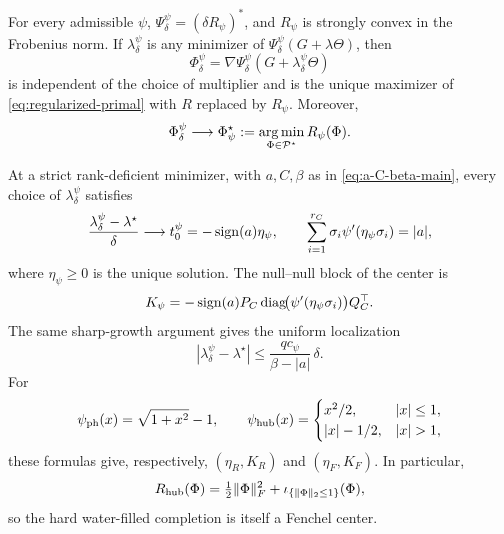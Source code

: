 \begin{proposition}
\label{prop:smoothing-family-main}
For every admissible \(\psi\),
\(\Psi_\delta^\psi=(\delta R_\psi)^*\), and \(R_\psi\) is strongly convex
in the Frobenius norm.  If \(\lambda_\delta^\psi\) is any minimizer of
\(\Psi_\delta^\psi(G+\lambda\Theta)\), then
\[
 \Phi_\delta^\psi=\nabla\Psi_\delta^\psi
   (G+\lambda_\delta^\psi\Theta)
\]
is independent of the choice of multiplier and is the unique maximizer of
\eqref{eq:regularized-primal} with \(R\) replaced by \(R_\psi\).  Moreover,
\begin{equation}
 \Phi_\delta^\psi\longrightarrow
 \Phi_\psi^\star:=\operatorname*{arg\,min}_{\Phi\in\mathcal P^\star}R_\psi(\Phi).
 \label{eq:profile-center-limit-main}
\end{equation}

At a strict rank-deficient minimizer, with \(a,C,\beta\) as in
\eqref{eq:a-C-beta-main}, every choice of \(\lambda_\delta^\psi\) satisfies
\begin{equation}
 \frac{\lambda_\delta^\psi-\lambda^\star}{\delta}
 \longrightarrow t_0^\psi=-\operatorname{sign}(a)\eta_\psi,
 \qquad
 \sum_{i=1}^{r_C}\sigma_i\psi'(\eta_\psi\sigma_i)=|a|,
 \label{eq:profile-strict-rate-main}
\end{equation}
where \(\eta_\psi\ge0\) is the unique solution.  The null--null block of
the center is
\begin{equation}
 K_\psi=-\operatorname{sign}(a)P_C\operatorname{diag}\!\bigl(
 \psi'(\eta_\psi\sigma_i)\bigr)Q_C^\top.
 \label{eq:profile-center-block-main}
\end{equation}
The same sharp-growth argument gives the uniform localization
\begin{equation}
 |\lambda_\delta^\psi-\lambda^\star|
 \le \frac{q c_\psi}{\beta-|a|}\,\delta.
 \label{eq:profile-strict-bound-main}
\end{equation}
For
\begin{equation}
 \psi_{\rm ph}(x)=\sqrt{1+x^2}-1,
 \qquad
 \psi_{\rm hub}(x)=
 \begin{cases}x^2/2,&|x|\le1,\\ |x|-1/2,&|x|>1,
 \end{cases}
 \label{eq:two-profile-members-main}
\end{equation}
these formulas give, respectively, \((\eta_R,K_R)\) and
\((\eta_F,K_F)\).  In particular,
\begin{equation}
 R_{\rm hub}(\Phi)=\tfrac12\|\Phi\|_F^2
 +\iota_{\{\|\Phi\|_2\le1\}}(\Phi),
 \label{eq:huber-regularizer-main}
\end{equation}
so the hard water-filled completion is itself a Fenchel center.
\end{proposition}

